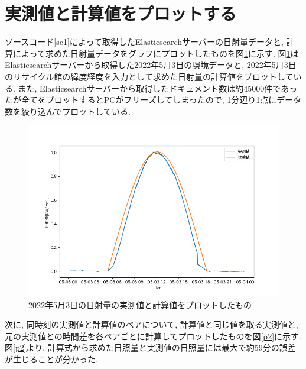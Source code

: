 \documentclass[a4j,12pt,]{jarticle}
\begin{document}
\section{実測値と計算値をプロットする}
ソースコード\ref{sc1}によって取得したElasticsearchサーバーの日射量データと, 計算によって求めた日射量データをグラフにプロットしたものを図\ref{p1}に示す.
図\ref{p1}はElasticsearchサーバーから取得した2022年5月3日の環境データと, 2022年5月3日のリサイクル館の緯度経度を入力として求めた日射量の計算値をプロットしている.
また, Elasticsearchサーバーから取得したドキュメント数は約45000件であったが全てをプロットするとPCがフリーズしてしまったので, 1分辺り1点にデータ数を絞り込んでプロットしている.

\begin{figure}[H]
  \begin{center}
    \includegraphics[width=160mm]{compare.png}
    \caption{2022年5月3日の日射量の実測値と計算値をプロットしたもの}
    \label{p1}
  \end{center}
\end{figure}

次に, 同時刻の実測値と計算値のペアについて, 計算値と同じ値を取る実測値と, 元の実測値との時間差を各ペアごとに計算してプロットしたものを図\ref{p2}に示す.
図\ref{p2}より, 計算式から求めた日照量と実測値の日照量には最大で約59分の誤差が生じることが分かった.
\end{document}
